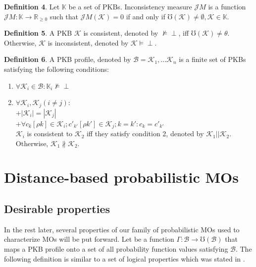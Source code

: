 \documentclass[]{iosart2c}
\begin{document}
  \textbf{Definition 4}. Let $\mathbb{K}$ be a set of PKBs. Inconsistency measure $\mathcal{J}M$ is a function $\mathcal{J}M: \mathbb{K} \to \mathbb {R}_{\geq 0}$ such that $\mathcal{J}M(\mathcal{K}) = 0$ if and only if $\mho (\mathcal{K}) \neq \emptyset, \mathcal{K} \in \mathbb{K}$.

  \textbf{Definition 5}. A PKB $\mathcal{K}$ is consistent, denoted by $\nvDash \perp$, iff $\mho (\mathcal{K}) \neq \theta$. Otherwise, $\mathcal{K}$ is inconsistent, denoted by $\mathcal{K} \models \perp$.

  \textbf{Definition 6}. A PKB profile, denoted by $\mathcal{B} = {\mathcal{K}_1, ...\mathcal{K}_n}$ is a finite set of PKBs satisfying the following conditions:

  \begin{enumerate}

    \item $\forall \mathcal{K}_i \in \mathcal{B} : \mathbb{K}_i \nvDash \perp$
    \item $\forall \mathcal{K}_i,\mathcal{K}_j (i \neq j) :$\\
    $+|\mathcal{K}_i| = |\mathcal{K}_j|$ \\
    $+\forall c_k[\rho k] \in \mathcal{K}_i; c'_{k'} [\rho k'] \in \mathcal{K}_j; k = k' : c_k = c'_{k'}$\\
    $\mathcal{K}_i$ is consistent to $\mathcal{K}_2$ iff they satisfy condition 2, denoted by $\mathcal{K}_1||\mathcal{K}_2$. Otherwise, $\mathcal{K}_1 \nparallel \mathcal{K}_2$.

  \end{enumerate}


  \section{Distance-based probabilistic MOs}

  \subsection{Desirable properties}

  In the rest later, several properties of our family of probabilistic MOs used to characterize MOs will be put forward. Let be a function $\Gamma: \mathcal{B} \to \mho(\mathcal{B})$ that maps a PKB profile onto a set of all probability function values satisfying $\mathcal{B}$. The following definition is similar to a set of logical properties which was stated in \citep{3} \citep{28}.
\end{document}
